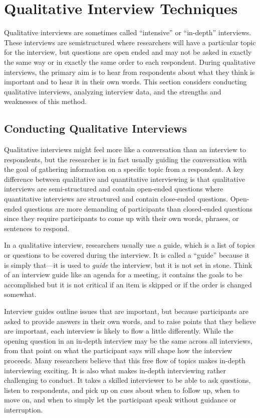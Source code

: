 \section{Qualitative Interview Techniques}

Qualitative interviews are sometimes called ``intensive'' or ``in-depth'' interviews. These interviews are semistructured where researchers will have a particular topic for the interview, but questions are open ended and may not be asked in exactly the same way or in exactly the same order to each respondent. During qualitative interviews, the primary aim is to hear from respondents about what they think is important and to hear it in their own words. This section considers conducting qualitative interviews, analyzing interview data, and the strengths and weaknesses of this method.

\subsection{Conducting Qualitative Interviews}

Qualitative interviews might feel more like a conversation than an interview to respondents, but the researcher is in fact usually guiding the conversation with the goal of gathering information on a specific topic from a respondent. A key difference between qualitative and quantitative interviewing is that qualitative interviews are semi-structured and contain open-ended questions where quantitative interviews are structured and contain close-ended questions. Open-ended questions are more demanding of participants than closed-ended questions since they require participants to come up with their own words, phrases, or sentences to respond.

In a qualitative interview, researchers usually use a guide, which is a list of topics or questions to be covered during the interview. It is called a ``guide'' because it is simply that---it is used to \textit{guide} the interview, but it is not set in stone. Think of an interview guide like an agenda for a meeting, it contains the goals to be accomplished but it is not critical if an item is skipped or if the order is changed somewhat. 

Interview guides outline issues that are important, but because participants are asked to provide answers in their own words, and to raise points that they believe are important, each interview is likely to flow a little differently. While the opening question in an in-depth interview may be the same across all interviews, from that point on what the participant says will shape how the interview proceeds. Many researchers believe that this free flow of topics makes in-depth interviewing exciting. It is also what makes in-depth interviewing rather challenging to conduct. It takes a skilled interviewer to be able to ask questions, listen to respondents, and pick up on cues about when to follow up, when to move on, and when to simply let the participant speak without guidance or interruption.


